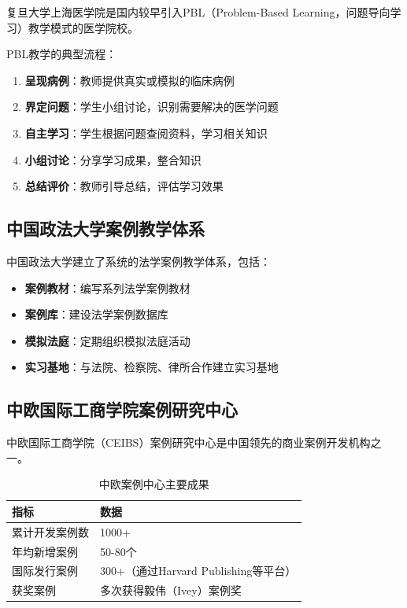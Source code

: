 \documentclass[12pt,a4paper]{ctexart}
\begin{document}
复旦大学上海医学院是国内较早引入PBL（Problem-Based Learning，问题导向学习）教学模式的医学院校。

PBL教学的典型流程：
\begin{enumerate}[leftmargin=2em]
    \item \textbf{呈现病例}：教师提供真实或模拟的临床病例
    \item \textbf{界定问题}：学生小组讨论，识别需要解决的医学问题
    \item \textbf{自主学习}：学生根据问题查阅资料，学习相关知识
    \item \textbf{小组讨论}：分享学习成果，整合知识
    \item \textbf{总结评价}：教师引导总结，评估学习效果
\end{enumerate}

\subsection{中国政法大学案例教学体系}

中国政法大学建立了系统的法学案例教学体系，包括：
\begin{itemize}[leftmargin=2em]
    \item \textbf{案例教材}：编写系列法学案例教材
    \item \textbf{案例库}：建设法学案例数据库
    \item \textbf{模拟法庭}：定期组织模拟法庭活动
    \item \textbf{实习基地}：与法院、检察院、律所合作建立实习基地
\end{itemize}

\subsection{中欧国际工商学院案例研究中心}

中欧国际工商学院（CEIBS）案例研究中心是中国领先的商业案例开发机构之一。

\begin{table}[htbp]
\centering
\caption{中欧案例中心主要成果}
\begin{tabular}{ll}
\toprule
\textbf{指标} & \textbf{数据} \\
\midrule
累计开发案例数 & 1000+ \\
年均新增案例 & 50-80个 \\
国际发行案例 & 300+（通过Harvard Publishing等平台）\\
获奖案例 & 多次获得毅伟（Ivey）案例奖 \\
\bottomrule
\end{tabular}
\end{table}
\end{document}
